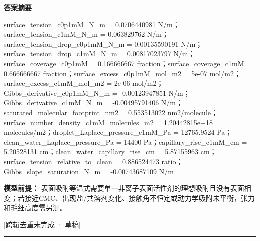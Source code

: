 \documentclass[UTF8,11pt,a4paper]{ctexart}
\begin{document}
\noindent\textbf{答案摘要}\par
surface\_tension\_c0p1mM\_N\_m = 0.0706440981 N/m；surface\_tension\_c1mM\_N\_m = 0.063829762 N/m；surface\_tension\_drop\_c0p1mM\_N\_m = 0.00135590191 N/m；surface\_tension\_drop\_c1mM\_N\_m = 0.00817023797 N/m；surface\_coverage\_c0p1mM = 0.166666667 fraction；surface\_coverage\_c1mM = 0.666666667 fraction；surface\_excess\_c0p1mM\_mol\_m2 = 5e-07 mol/m2；surface\_excess\_c1mM\_mol\_m2 = 2e-06 mol/m2；Gibbs\_derivative\_c0p1mM\_N\_m = -0.00123947851 N/m；Gibbs\_derivative\_c1mM\_N\_m = -0.00495791406 N/m；saturated\_molecular\_footprint\_nm2 = 0.553513022 nm2/molecule；surface\_number\_density\_c1mM\_molecules\_m2 = 1.20442815e+18 molecules/m2；droplet\_Laplace\_pressure\_c1mM\_Pa = 12765.9524 Pa；clean\_water\_Laplace\_pressure\_Pa = 14400 Pa；capillary\_rise\_c1mM\_cm = 5.20528131 cm；clean\_water\_capillary\_rise\_cm = 5.87155963 cm；surface\_tension\_relative\_to\_clean = 0.886524473 ratio；Gibbs\_slope\_saturation\_N\_m = -0.00743687109 N/m\par
\noindent\textbf{模型前提：}
表面吸附等温式需要单一非离子表面活性剂的理想吸附且没有表面相变；若接近CMC、出现盐/共溶剂变化、接触角不恒定或动力学吸附未平衡，张力和毛细高度需另测。\par
\noindent\textcolor{red!65!black}{[跨辑去重未完成 · 草稿]} \par
\medskip\hrule\medskip
{}
\end{document}
